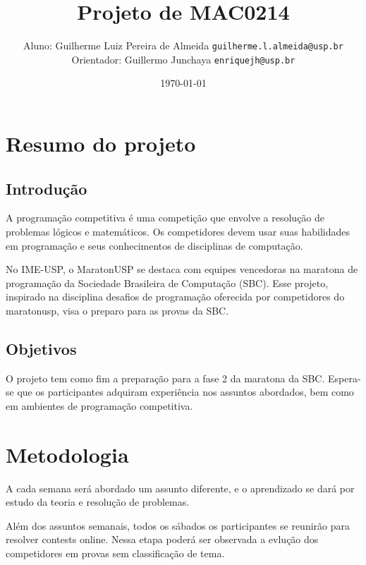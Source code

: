 \documentclass{article}
\title{Projeto de MAC0214}
\author[1]{
    Aluno: Guilherme Luiz Pereira de Almeida
    \texttt{guilherme.l.almeida@usp.br} \\
    Orientador: Guillermo Junchaya
    \texttt{enriquejh@usp.br}
}
\date{\today}
\begin{document}
\maketitle

\vspace{6cm}

\tableofcontents  %

\pagebreak

\section{Resumo do projeto}
\subsection{Introdução}
\hspace{1cm}A programação competitiva é uma competição que envolve a resolução de problemas lógicos e matemáticos. Os competidores devem usar suas habilidades em programação e seus conhecimentos de disciplinas de computação.

\hspace{5mm}No IME-USP, o MaratonUSP se destaca com equipes vencedoras na maratona de programação da Sociedade Brasileira de Computação (SBC). Esse projeto, inspirado na disciplina desafios de programação oferecida por competidores do maratonusp, visa o preparo para as provas da SBC.
\subsection{Objetivos}
\hspace{1cm} O projeto tem como fim a preparação para a fase 2 da maratona da SBC. Espera-se que os participantes adquiram experiência nos assuntos abordados, bem como em ambientes de programação competitiva.

\section{Metodologia}
\hspace{1cm}A cada semana será abordado um assunto diferente, e o aprendizado se dará por estudo da teoria e resolução de problemas.

\hspace{0.5cm}Além dos assuntos semanais, todos os sábados os participantes se reunirão para resolver contests online. Nessa etapa poderá ser observada a evlução dos competidores em provas sem classificação de tema.
\end{document}
